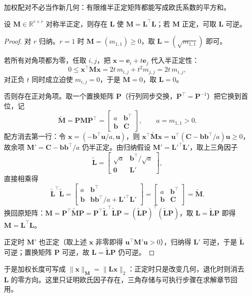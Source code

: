 加权配对不必当作新几何：有限维半正定矩阵都能写成欧氏系数的平方和。
\begin{theorem}[半正定矩阵的配方因子]
\label{thm:ls-gram-factor}
设 $\bm M\in\mathbb R^{r\times r}$ 对称半正定，则存在 $\bm L$ 使 $\bm M=\bm L^\top\bm L$；若 $\bm M$ 正定，可取 $\bm L$ 可逆。
\end{theorem}
\begin{proof}
对 $r$ 归纳。$r=1$ 时 $\bm M=(m_{1,1})\geq0$，取 $\bm L=(\sqrt{m_{1,1}})$ 即可。

若所有对角项都为零，任取 $i,j$，把 $\bm x=\bm e_i+t\bm e_j$ 代入半正定性：
\[
 0\leq\bm x^\top\bm M\bm x=2t\,m_{i,j}+t^2m_{j,j}=2t\,m_{i,j},
\]
对正负 $t$ 同时成立迫使 $m_{i,j}=0$，于是 $\bm M=0$，取 $\bm L=0$。

否则存在正对角项。取一个置换矩阵 $\bm P$（行列同步交换，$\bm P^\top=\bm P^{-1}$）把它换到首位，记
\[
 \widetilde{\bm M}=\bm P\bm M\bm P^\top
 =\begin{bmatrix}a&\bm b^\top\\ \bm b&\bm C\end{bmatrix},\qquad a=m_{1,1}>0.
\]
配方消去第一行：令 $\bm x=(-\bm b^\top\bm u/a,\bm u)$，则 $\bm x^\top\widetilde{\bm M}\bm x=\bm u^\top(\bm C-\bm b\bm b^\top/a)\bm u\geq0$，故余项 $\bm M'=\bm C-\bm b\bm b^\top/a$ 仍半正定。由归纳假设 $\bm M'=\bm L'^\top\bm L'$，取上三角因子
\[
 \widetilde{\bm L}=\begin{bmatrix}\sqrt a&\bm b^\top/\sqrt a\\ \bm0&\bm L'\end{bmatrix},
\]
直接相乘得
\[
 \widetilde{\bm L}^\top\widetilde{\bm L}
 =\begin{bmatrix}a&\bm b^\top\\ \bm b&\bm b\bm b^\top/a+\bm L'^\top\bm L'\end{bmatrix}
 =\begin{bmatrix}a&\bm b^\top\\ \bm b&\bm C\end{bmatrix}
 =\widetilde{\bm M}.
\]
换回原矩阵：$\bm M=\bm P^\top\widetilde{\bm M}\bm P=\bm P^\top\widetilde{\bm L}^\top\widetilde{\bm L}\bm P=(\widetilde{\bm L}\bm P)^\top(\widetilde{\bm L}\bm P)$，取 $\bm L=\widetilde{\bm L}\bm P$ 即得 $\bm M=\bm L^\top\bm L$。

正定时 $\bm M'$ 也正定（取上述 $\bm x$ 非零即得 $\bm u^\top\bm M'\bm u>0$），归纳得 $\bm L'$ 可逆，于是 $\widetilde{\bm L}$ 可逆；置换矩阵 $\bm P$ 可逆，故 $\bm L=\widetilde{\bm L}\bm P$ 仍可逆。
\end{proof}
于是加权长度可写成 $\lVert\bm x\rVert_{\bm M}=\lVert\bm L\bm x\rVert_2$：正定时只是改变几何，退化时则消去 $\bm L$ 的零方向。这里只证明欧氏因子存在，三角存储与可执行步骤在求解章节回用。


